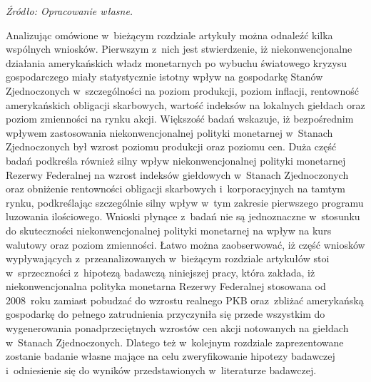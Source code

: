 \begin{landscape}
\begin{table}[!ht]
\begin{tabular}{M{5cm}M{3cm}M{2.5cm}M{3cm}M{3cm}M{2.5cm}M{3cm}}
\bottomrule
\end{tabular}
\begin{flushleft}
\hspace{1cm}\textit{\footnotesize{Źródło: Opracowanie własne.}} \\
\end{flushleft}
\vspace{-0.5cm}
\end{table} 
\end{landscape}

\newpage
Analizując omówione w~bieżącym rozdziale artykuły można odnaleźć kilka wspólnych wniosków. Pierwszym z~nich jest stwierdzenie, iż niekonwencjonalne działania amerykańskich władz monetarnych po wybuchu światowego kryzysu gospodarczego miały statystycznie istotny wpływ na gospodarkę Stanów Zjednoczonych w~szczególności na poziom produkcji, poziom inflacji, rentowność amerykańskich obligacji skarbowych, wartość indeksów na lokalnych giełdach oraz poziom zmienności na rynku akcji. Większość badań wskazuje, iż bezpośrednim wpływem zastosowania niekonwencjonalnej polityki monetarnej w~Stanach Zjednoczonych był wzrost poziomu produkcji oraz poziomu cen. Duża część badań podkreśla również silny wpływ niekonwencjonalnej polityki monetarnej Rezerwy Federalnej na wzrost indeksów giełdowych w~Stanach Zjednoczonych oraz obniżenie rentowności obligacji skarbowych i~korporacyjnych na tamtym rynku, podkreślając szczególnie silny wpływ w~tym zakresie pierwszego programu luzowania ilościowego. Wnioski płynące z~badań nie są jednoznaczne w~stosunku do skuteczności niekonwencjonalnej polityki monetarnej na wpływ na kurs walutowy oraz poziom zmienności. Łatwo można zaobserwować, iż część wniosków wypływających z~przeanalizowanych w~bieżącym rozdziale artykułów stoi w~sprzeczności z~hipotezą badawczą niniejszej pracy, która zakłada, iż niekonwencjonalna polityka monetarna Rezerwy Federalnej stosowana od 2008~roku zamiast pobudzać do wzrostu realnego \acs{PKB} oraz~zbliżać amerykańską gospodarkę do pełnego zatrudnienia przyczyniła się przede wszystkim do wygenerowania ponadprzeciętnych wzrostów cen akcji notowanych na giełdach w~Stanach Zjednoczonych. Dlatego też w~kolejnym rozdziale zaprezentowane zostanie badanie własne mające na celu zweryfikowanie hipotezy badawczej i~odniesienie się do wyników przedstawionych w~literaturze badawczej.